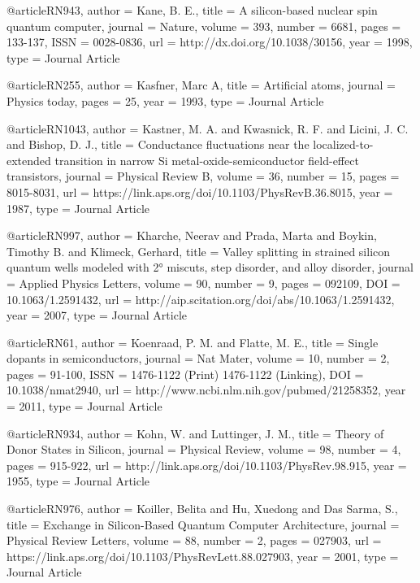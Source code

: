 @article{RN943,
   author = {Kane, B. E.},
   title = {A silicon-based nuclear spin quantum computer},
   journal = {Nature},
   volume = {393},
   number = {6681},
   pages = {133-137},
   ISSN = {0028-0836},
   url = {http://dx.doi.org/10.1038/30156},
   year = {1998},
   type = {Journal Article}
}

@article{RN255,
   author = {Kasfner, Marc A},
   title = {Artificial atoms},
   journal = {Physics today},
   pages = {25},
   year = {1993},
   type = {Journal Article}
}

@article{RN1043,
   author = {Kastner, M. A. and Kwasnick, R. F. and Licini, J. C. and Bishop, D. J.},
   title = {Conductance fluctuations near the localized-to-extended transition in narrow Si metal-oxide-semiconductor field-effect transistors},
   journal = {Physical Review B},
   volume = {36},
   number = {15},
   pages = {8015-8031},
   url = {https://link.aps.org/doi/10.1103/PhysRevB.36.8015},
   year = {1987},
   type = {Journal Article}
}

@article{RN997,
   author = {Kharche, Neerav and Prada, Marta and Boykin, Timothy B. and Klimeck, Gerhard},
   title = {Valley splitting in strained silicon quantum wells modeled with 2° miscuts, step disorder, and alloy disorder},
   journal = {Applied Physics Letters},
   volume = {90},
   number = {9},
   pages = {092109},
   DOI = {10.1063/1.2591432},
   url = {http://aip.scitation.org/doi/abs/10.1063/1.2591432},
   year = {2007},
   type = {Journal Article}
}

@article{RN61,
   author = {Koenraad, P. M. and Flatte, M. E.},
   title = {Single dopants in semiconductors},
   journal = {Nat Mater},
   volume = {10},
   number = {2},
   pages = {91-100},
   ISSN = {1476-1122 (Print)
1476-1122 (Linking)},
   DOI = {10.1038/nmat2940},
   url = {http://www.ncbi.nlm.nih.gov/pubmed/21258352},
   year = {2011},
   type = {Journal Article}
}

@article{RN934,
   author = {Kohn, W. and Luttinger, J. M.},
   title = {Theory of Donor States in Silicon},
   journal = {Physical Review},
   volume = {98},
   number = {4},
   pages = {915-922},
   url = {http://link.aps.org/doi/10.1103/PhysRev.98.915},
   year = {1955},
   type = {Journal Article}
}

@article{RN976,
   author = {Koiller, Belita and Hu, Xuedong and Das Sarma, S.},
   title = {Exchange in Silicon-Based Quantum Computer Architecture},
   journal = {Physical Review Letters},
   volume = {88},
   number = {2},
   pages = {027903},
   url = {https://link.aps.org/doi/10.1103/PhysRevLett.88.027903},
   year = {2001},
   type = {Journal Article}
}

